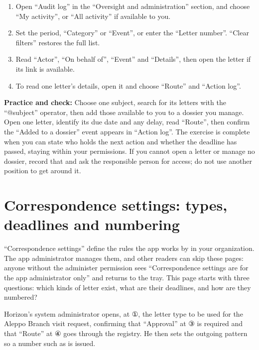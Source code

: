 \begin{enumerate}
\item Open “Audit log” in the “Oversight and administration” section, and choose “My activity”, or “All activity” if available to you.
\item Set the period, “Category” or “Event”, or enter the “Letter number”. “Clear filters” restores the full list.
\item Read “Actor”, “On behalf of”, “Event” and “Details”, then open the letter if its link is available.
\item To read one letter’s details, open it and choose “Route” and “Action log”.
\end{enumerate}

\textbf{Practice and check:} Choose one subject, search for its letters with the “@subject” operator, then add those available to you to a dossier you manage. Open one letter, identify its due date and any delay, read “Route”, then confirm the “Added to a dossier” event appears in “Action log”. The exercise is complete when you can state who holds the next action and whether the deadline has passed, staying within your permissions. If you cannot open a letter or manage no dossier, record that and ask the responsible person for access; do not use another position to get around it.

\clearpage
\section{Correspondence settings: types, deadlines and numbering}
\label{sec:correspondence-feature-settings-types}

“Correspondence settings” define the rules the app works by in your organization. The app administrator manages them, and other readers can skip these pages: anyone without the administer permission sees “Correspondence settings are for the app administrator only” and returns to the tray. This page starts with three questions: which kinds of letter exist, what are their deadlines, and how are they numbered?

\begin{rcnote}
Horizon’s system administrator opens, at ①, the letter type to be used for the Aleppo Branch visit request, confirming that “Approval” at ③ is required and that “Route” at ④ goes through the registry. He then sets the outgoing pattern so a number such as  is issued.
\end{rcnote}

